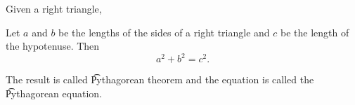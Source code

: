 
Given a right triangle,

\begin{proposition}
Let $a$ and $b$ be the lengths of the sides of a right triangle and $c$ be the length of the hypotenuse. Then
  \[
a^2 + b^2 = c^2.
  \]
\end{proposition}
The result is called \t{Pythagorean theorem} and the equation is called the \t{Pythagorean equation}.

\blankpage
